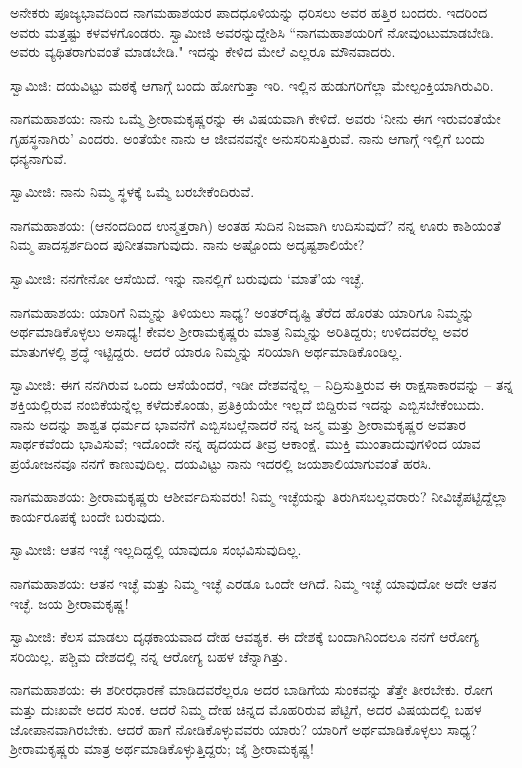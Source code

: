ಅನೇಕರು ಪೂಜ್ಯಭಾವದಿಂದ ನಾಗಮಹಾಶಯರ ಪಾದಧೂಳಿಯನ್ನು ಧರಿಸಲು ಅವರ ಹತ್ತಿರ ಬಂದರು. ಇದರಿಂದ ಅವರು ಮತ್ತಷ್ಟು ಕಳವಳಗೊಂಡರು. ಸ್ವಾಮೀಜಿ ಅವರನ್ನುದ್ದೇಶಿಸಿ “ನಾಗಮಹಾಶಯರಿಗೆ ನೋವುಂಟುಮಾಡಬೇಡಿ. ಅವರು ವ್ಯಥಿತರಾಗುವಂತೆ ಮಾಡಬೇಡಿ." ಇದನ್ನು ಕೇಳಿದ ಮೇಲೆ ಎಲ್ಲರೂ ಮೌನವಾದರು.

ಸ್ವಾಮಿಜಿ: ದಯವಿಟ್ಟು ಮಠಕ್ಕೆ ಆಗಾಗ್ಗೆ ಬಂದು ಹೋಗುತ್ತಾ ಇರಿ. ಇಲ್ಲಿನ ಹುಡುಗರಿಗೆಲ್ಲಾ ಮೇಲ್ಪಂಕ್ತಿಯಾಗಿರುವಿರಿ.

ನಾಗಮಹಾಶಯ: ನಾನು ಒಮ್ಮೆ ಶ‍್ರೀರಾಮಕೃಷ್ಣರನ್ನು ಈ ವಿಷಯವಾಗಿ ಕೇಳಿದೆ. ಅವರು ‘ನೀನು ಈಗ ಇರುವಂತೆಯೇ ಗೃಹಸ್ಥನಾಗಿರು’ ಎಂದರು. ಅಂತೆಯೇ ನಾನು ಆ ಜೀವನವನ್ನೇ ಅನುಸರಿಸುತ್ತಿರುವೆ. ನಾನು ಆಗಾಗ್ಗೆ ಇಲ್ಲಿಗೆ ಬಂದು ಧನ್ಯನಾಗುವೆ.

ಸ್ವಾಮೀಜಿ: ನಾನು ನಿಮ್ಮ ಸ್ಥಳಕ್ಕೆ ಒಮ್ಮೆ ಬರಬೇಕೆಂದಿರುವೆ.

ನಾಗಮಹಾಶಯ: (ಆನಂದದಿಂದ ಉನ್ಮತ್ತರಾಗಿ) ಅಂತಹ ಸುದಿನ ನಿಜವಾಗಿ ಉದಿಸುವುದೆ? ನನ್ನ ಊರು ಕಾಶಿಯಂತೆ ನಿಮ್ಮ ಪಾದಸ್ಪರ್ಶದಿಂದ ಪುನೀತವಾಗುವುದು. ನಾನು ಅಷ್ಟೊಂದು ಅದೃಷ್ಟಶಾಲಿಯೇ?

ಸ್ವಾಮೀಜಿ: ನನಗೇನೋ ಆಸೆಯಿದೆ. ಇನ್ನು ನಾನಲ್ಲಿಗೆ ಬರುವುದು ‘ಮಾತೆ’ಯ ಇಚ್ಛೆ.

ನಾಗಮಹಾಶಯ: ಯಾರಿಗೆ ನಿಮ್ಮನ್ನು ತಿಳಿಯಲು ಸಾಧ್ಯ? ಅಂತರ್‌ದೃಷ್ಟಿ ತೆರೆದ ಹೊರತು ಯಾರಿಗೂ ನಿಮ್ಮನ್ನು ಅರ್ಥಮಾಡಿಕೊಳ್ಳಲು ಅಸಾಧ್ಯ! ಕೇವಲ ಶ‍್ರೀರಾಮಕೃಷ್ಣರು ಮಾತ್ರ ನಿಮ್ಮನ್ನು ಅರಿತಿದ್ದರು; ಉಳಿದವರೆಲ್ಲ ಅವರ ಮಾತುಗಳಲ್ಲಿ ಶ್ರದ್ಧೆ ಇಟ್ಟಿದ್ದರು. ಆದರೆ ಯಾರೂ ನಿಮ್ಮನ್ನು ಸರಿಯಾಗಿ ಅರ್ಥಮಾಡಿಕೊಂಡಿಲ್ಲ.

ಸ್ವಾಮೀಜಿ: ಈಗ ನನಗಿರುವ ಒಂದು ಆಸೆಯೆಂದರೆ, ಇಡೀ ದೇಶವನ್ನೆಲ್ಲ – ನಿದ್ರಿಸುತ್ತಿರುವ ಈ ರಾಕ್ಷಸಾಕಾರವನ್ನು – ತನ್ನ ಶಕ್ತಿಯಲ್ಲಿರುವ ನಂಬಿಕೆಯನ್ನೆಲ್ಲ ಕಳೆದುಕೊಂಡು, ಪ್ರತಿಕ್ರಿಯೆಯೇ ಇಲ್ಲದೆ ಬಿದ್ದಿರುವ ಇದನ್ನು ಎಬ್ಬಿಸಬೇಕೆಂಬುದು. ನಾನು ಅದನ್ನು ಶಾಶ್ವತ ಧರ್ಮದ ಭಾವನೆಗೆ ಎಬ್ಬಿಸಬಲ್ಲೆನಾದರೆ ನನ್ನ ಜನ್ಮ ಮತ್ತು ಶ‍್ರೀರಾಮಕೃಷ್ಣರ ಅವತಾರ ಸಾರ್ಥಕವೆಂದು ಭಾವಿಸುವೆ; ಇದೊಂದೇ ನನ್ನ ಹೃದಯದ ತೀವ್ರ ಆಕಾಂಕ್ಷೆ. ಮುಕ್ತಿ ಮುಂತಾದುವುಗಳಿಂದ ಯಾವ ಪ್ರಯೋಜನವೂ ನನಗೆ ಕಾಣುವುದಿಲ್ಲ. ದಯವಿಟ್ಟು ನಾನು ಇದರಲ್ಲಿ ಜಯಶಾಲಿಯಾಗುವಂತೆ ಹರಸಿ.

ನಾಗಮಹಾಶಯ: ಶ‍್ರೀರಾಮಕೃಷ್ಣರು ಆಶೀರ್ವದಿಸುವರು! ನಿಮ್ಮ ಇಚ್ಛೆಯನ್ನು ತಿರುಗಿಸಬಲ್ಲವರಾರು? ನೀವಿಚ್ಛೆಪಟ್ಟಿದ್ದೆಲ್ಲಾ ಕಾರ್ಯರೂಪಕ್ಕೆ ಬಂದೇ ಬರುವುದು.

ಸ್ವಾಮೀಜಿ: ಆತನ ಇಚ್ಛೆ ಇಲ್ಲದಿದ್ದಲ್ಲಿ ಯಾವುದೂ ಸಂಭವಿಸುವುದಿಲ್ಲ.

ನಾಗಮಹಾಶಯ: ಆತನ ಇಚ್ಛೆ ಮತ್ತು ನಿಮ್ಮ ಇಚ್ಛೆ ಎರಡೂ ಒಂದೇ ಆಗಿದೆ. ನಿಮ್ಮ ಇಚ್ಛೆ ಯಾವುದೋ ಅದೇ ಆತನ ಇಚ್ಛೆ. ಜಯ ಶ‍್ರೀರಾಮಕೃಷ್ಣ!

ಸ್ವಾಮೀಜಿ: ಕೆಲಸ ಮಾಡಲು ದೃಢಕಾಯವಾದ ದೇಹ ಆವಶ್ಯಕ. ಈ ದೇಶಕ್ಕೆ ಬಂದಾಗಿನಿಂದಲೂ ನನಗೆ ಆರೋಗ್ಯ ಸರಿಯಿಲ್ಲ. ಪಶ್ಚಿಮ ದೇಶದಲ್ಲಿ ನನ್ನ ಆರೋಗ್ಯ ಬಹಳ ಚೆನ್ನಾಗಿತ್ತು.

ನಾಗಮಹಾಶಯ: ಈ ಶರೀರಧಾರಣೆ ಮಾಡಿದವರೆಲ್ಲರೂ ಅದರ ಬಾಡಿಗೆಯ ಸುಂಕವನ್ನು ತೆತ್ತೇ ತೀರಬೇಕು. ರೋಗ ಮತ್ತು ದುಃಖವೇ ಅದರ ಸುಂಕ. ಆದರೆ ನಿಮ್ಮ ದೇಹ ಚಿನ್ನದ ಮೊಹರಿರುವ ಪೆಟ್ಟಿಗೆ, ಅದರ ವಿಷಯದಲ್ಲಿ ಬಹಳ ಜೋಪಾನವಾಗಿರಬೇಕು. ಆದರೆ ಹಾಗೆ ನೋಡಿಕೊಳ್ಳುವವರು ಯಾರು? ಯಾರಿಗೆ ಅರ್ಥಮಾಡಿಕೊಳ್ಳಲು ಸಾಧ್ಯ? ಶ‍್ರೀರಾಮಕೃಷ್ಣರು ಮಾತ್ರ ಅರ್ಥಮಾಡಿಕೊಳ್ಳುತ್ತಿದ್ದರು; ಜೈ ಶ‍್ರೀರಾಮಕೃಷ್ಣ!

